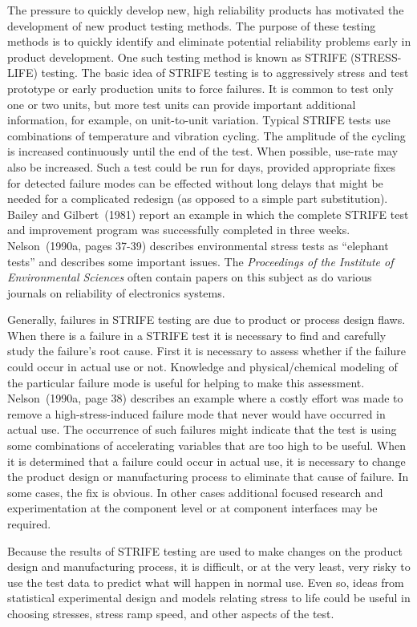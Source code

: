 The pressure to quickly develop new, high reliability products has
motivated the development of new product testing methods. The
purpose of these testing methods is to quickly identify and
eliminate potential reliability problems early in product
development.  One such testing method is known as STRIFE
(STRESS-LIFE) testing.  The basic idea of STRIFE testing is to
aggressively stress and test prototype or early production units to
force failures. It is common to test only one or two units, but more
test units can provide important additional information, for
example, on unit-to-unit variation.  Typical STRIFE tests use
combinations of temperature and vibration cycling. The amplitude of
the cycling is increased continuously until the end of the
test. When possible, use-rate may also be increased.  Such a test
could be run for days, provided appropriate fixes for detected
failure modes can be effected without long delays that might be
needed for a complicated redesign (as opposed to a simple part
substitution). Bailey and Gilbert~(1981) report an example in which
the complete STRIFE test and improvement program was successfully
completed in three weeks.  Nelson~(1990a, pages 37-39) describes
environmental stress tests as ``elephant tests'' and describes some
important issues.  The {\em Proceedings of the Institute of
Environmental Sciences} often contain papers on this subject as do
various journals on reliability of electronics systems.

Generally, failures in STRIFE testing are due to product or process
design flaws. When there is a failure in a STRIFE test it is necessary
to find and carefully study the failure's root cause.  First it is
necessary to assess whether if the failure could occur in actual use or not.
Knowledge and physical/chemical modeling of the particular failure
mode is useful for helping to make this assessment.  Nelson~(1990a,
page 38) describes an example where a costly effort was made to remove
a high-stress-induced failure mode that never would have occurred in
actual use.  The occurrence of such failures might indicate that the
test is using some combinations of accelerating variables that are too
high to be useful.  When it is determined that a failure could occur
in actual use, it is necessary to change the product design or
manufacturing process to eliminate that cause of failure.  In some
cases, the fix is obvious.  In other cases additional focused research
and experimentation at the component level or at component interfaces
may be required.

Because the results of STRIFE testing are used to make changes on
the product design and manufacturing process, it is difficult, or at
the very least, very risky to use the test data to predict what will
happen in normal use. Even so, ideas from statistical experimental
design and models relating stress to life could be useful in
choosing stresses, stress ramp speed, and other aspects of the test.

